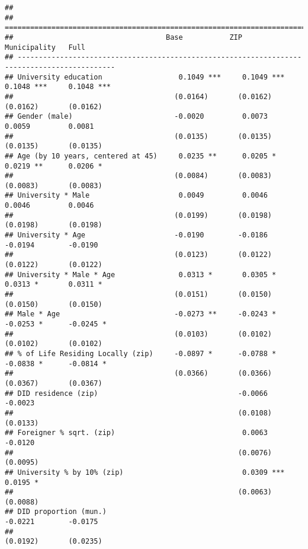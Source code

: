 \documentclass[
]{article}
\begin{document}
\begin{verbatim}
## 
## =============================================================================================
##                                    Base           ZIP            Municipality   Full         
## ---------------------------------------------------------------------------------------------
## University education                  0.1049 ***     0.1049 ***     0.1048 ***     0.1048 ***
##                                      (0.0164)       (0.0162)       (0.0162)       (0.0162)   
## Gender (male)                        -0.0020         0.0073         0.0059         0.0081    
##                                      (0.0135)       (0.0135)       (0.0135)       (0.0135)   
## Age (by 10 years, centered at 45)     0.0235 **      0.0205 *       0.0219 **      0.0206 *  
##                                      (0.0084)       (0.0083)       (0.0083)       (0.0083)   
## University * Male                     0.0049         0.0046         0.0046         0.0046    
##                                      (0.0199)       (0.0198)       (0.0198)       (0.0198)   
## University * Age                     -0.0190        -0.0186        -0.0194        -0.0190    
##                                      (0.0123)       (0.0122)       (0.0122)       (0.0122)   
## University * Male * Age               0.0313 *       0.0305 *       0.0313 *       0.0311 *  
##                                      (0.0151)       (0.0150)       (0.0150)       (0.0150)   
## Male * Age                           -0.0273 **     -0.0243 *      -0.0253 *      -0.0245 *  
##                                      (0.0103)       (0.0102)       (0.0102)       (0.0102)   
## % of Life Residing Locally (zip)     -0.0897 *      -0.0788 *      -0.0838 *      -0.0814 *  
##                                      (0.0366)       (0.0366)       (0.0367)       (0.0367)   
## DID residence (zip)                                 -0.0066                       -0.0023    
##                                                     (0.0108)                      (0.0133)   
## Foreigner % sqrt. (zip)                              0.0063                       -0.0120    
##                                                     (0.0076)                      (0.0095)   
## University % by 10% (zip)                            0.0309 ***                    0.0195 *  
##                                                     (0.0063)                      (0.0088)   
## DID proportion (mun.)                                              -0.0221        -0.0175    
##                                                                    (0.0192)       (0.0235)   

\end{verbatim}
\end{document}
